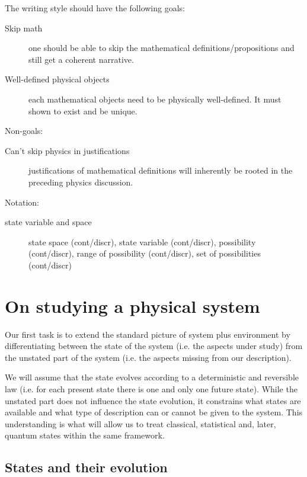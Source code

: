 \documentclass[aps,pra,10pt,twocolumn,floatfix,nofootinbib]{revtex4-1}
\theoremstyle{definition}
\begin{document}
The writing style should have the following goals:
\begin{description}
  \item[Skip math] one should be able to skip the mathematical definitions/propositions and still get a coherent narrative.
  \item[Well-defined physical objects] each mathematical objects need to be physically well-defined. It must shown to exist and be unique.
\end{description}
Non-goals:
\begin{description}
  \item[Can't skip physics in justifications] justifications of mathematical definitions will inherently be rooted in the preceding physics discussion.
\end{description}
Notation:
\begin{description}
  \item[state variable and space] state space (cont/discr), state variable (cont/discr), possibility (cont/discr), range of possibility (cont/discr), set of possibilities (cont/discr)
\end{description}

\section{On studying a physical system}


Our first task is to extend the standard picture of system plus environment by differentiating between the state of the system (i.e. the aspects under study) from the unstated part of the system (i.e. the aspects missing from our description).

We will assume that the state evolves according to a deterministic and reversible law (i.e. for each present state there is one and only one future state). While the unstated part does not influence the state evolution, it constrains what states are available and what type of description can or cannot be given to the system. This understanding is what will allow us to treat classical, statistical and, later, quantum states within the same framework.

\subsection{States and their evolution}
\end{document}
